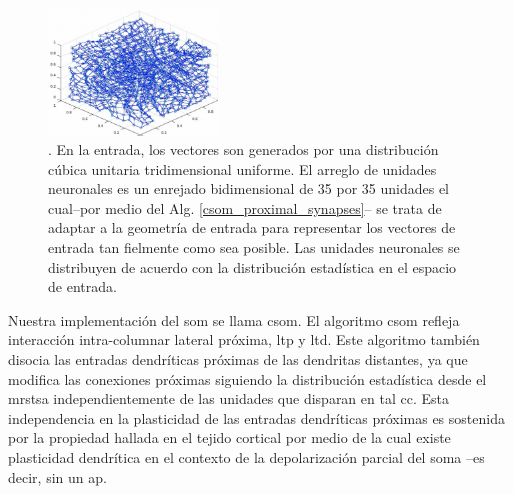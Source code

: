 \begin{figure}[h!]
    \centering
    \includegraphics[width=0.4\textwidth]{SOM.png}
    \caption{. En la entrada, los vectores son generados por una distribución cúbica unitaria tridimensional uniforme.
    El arreglo de unidades neuronales es un enrejado bidimensional de 35 por 35 unidades el cual--por medio del Alg. \ref{csom_proximal_synapses}--
    se trata de adaptar a la geometría de entrada para representar los vectores de entrada tan fielmente como sea posible.
    Las unidades neuronales se distribuyen de acuerdo con la distribución estadística en el espacio de entrada.}
    \label{fig:SOM}
\end{figure}

Nuestra implementación del \gls{som} se llama \gls{csom}. El algoritmo \gls{csom} refleja interacción intra-columnar lateral próxima, \gls{ltp} y \gls{ltd}. Este algoritmo también disocia las entradas dendríticas próximas de las dendritas distantes, ya que modifica las conexiones próximas siguiendo la distribución estadística desde el \gls{mrstsa} independientemente de las unidades que disparan en tal \gls{cc}. Esta independencia en la plasticidad de las entradas dendríticas próximas es sostenida por la propiedad hallada en el tejido cortical por medio de la cual existe plasticidad dendrítica en el contexto de la depolarización parcial del soma \cite{reiter_1998}--es decir, sin un \gls{ap}.



